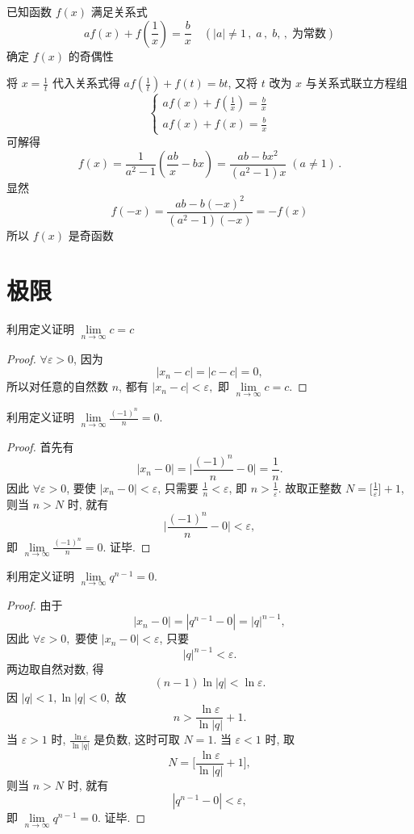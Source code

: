\documentclass[color=green,titlestyle=hang]{elegantbook}%
\author{唐绍东 \& TangShaodong}
\begin{document}
\maketitle
\tableofcontents
\mainmatter


\begin{example}
已知函数 $f(x)$ 满足关系式
\[af(x)+f\left(\frac{1}{x}\right)=\frac{b}{x}\quad(|a|\neq1\,,\;a\,,\;b,\,,\; \text{为常数})\]
确定 $f(x)$ 的奇偶性
\end{example}\begin{solution}
将 $x=\frac{1}{t}$ 代入关系式得 $af\left(\frac{1}{t}\right)+f(t)=bt$,
又将 $t$ 改为 $x$ 与关系式联立方程组
\[\begin{cases*}
af(x)+f\left(\frac{1}{x}\right)=\frac{b}{x}\\
af(x)+f(x)=\frac{b}{x}
\end{cases*}\]
可解得
\[f(x)=\frac{1}{a^2-1}\left(\frac{ab}{x}-bx\right)=\frac{ab-bx^2}{(a^2-1)x}\;(a\neq1)\,.\]
显然\[f(-x)=\frac{ab-b(-x)^2}{(a^2-1)(-x)}=-f(x)\]
所以 $f(x)$ 是奇函数
\end{solution}

\chapter{极限}

\begin{example}
利用定义证明 $\lim\limits_{n\to \infty}c=c$
\end{example}\begin{proof}
$\forall \varepsilon >0$, 因为 $$|x_n-c|=|c-c|=0,$$
所以对任意的自然数 $n$, 都有 $|x_n-c|<\varepsilon,$ 即 $\lim\limits_{n\to \infty}c=c$.	
\end{proof}

\begin{example}
利用定义证明 $\lim\limits_{n\to \infty}\frac{(-1)^n}{n}=0$.
\end{example}\begin{proof}
首先有 $$|x_n-0|=\Big|\frac{(-1)^n}{n}-0\Big|=\frac{1}{n}.$$ 因此 $\forall \varepsilon >0$,
要使 $|x_n-0|<\varepsilon$, 只需要 $\frac{1}{n}<\varepsilon$, 即 $n>\frac{1}{\varepsilon}$.
故取正整数 $N=\Big[\frac{1}{\varepsilon}\Big]+1$, \\
则当 $n>N$ 时, 就有$$\Big|\frac{(-1)^n}{n}-0\Big|<\varepsilon,$$
即 $\lim\limits_{n\to \infty}\frac{(-1)^n}{n}=0$. 证毕.	
\end{proof}

\begin{example}
利用定义证明  $\lim\limits_{n\to \infty}q^{n-1}=0$.	
\end{example}\begin{proof}
由于 $$|x_n-0|=|q^{n-1}-0|=|q|^{n-1},$$ 因此 $\forall \varepsilon >0,$
要使 $|x_n-0|<\varepsilon$, 只要
$$|q|^{n-1}<\varepsilon.$$
两边取自然对数, 得 $$(n-1)\ln|q|<\ln\varepsilon.$$  因 $|q|<1, \ln|q|<0,$
故
$$n>\frac{\ln\varepsilon}{\ln|q|}+1.$$
当 $\varepsilon>1$ 时, $\frac{\ln \varepsilon}{\ln|q|}$ 是负数, 这时可取 $N=1$. 当 $\varepsilon<1$ 时, 取
$$N=\Big[\frac{\ln \varepsilon}{\ln|q|}+1\Big],$$
则当 $n>N$ 时, 就有
$$|q^{n-1}-0|<\varepsilon,$$
即 $\lim\limits_{n\to \infty}q^{n-1}=0$. 证毕.	
\end{proof}
\end{document}
